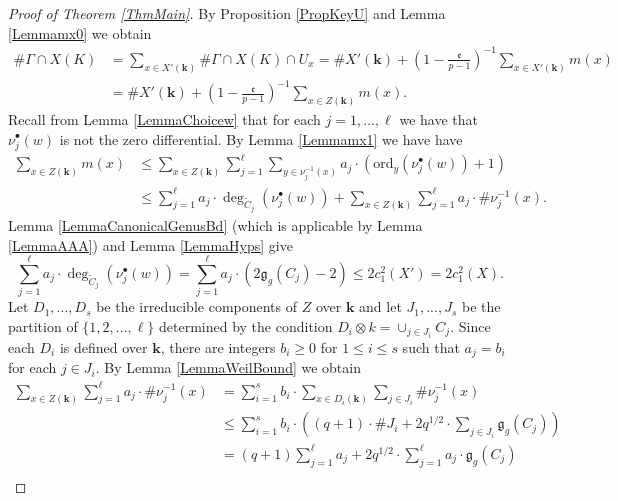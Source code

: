 \documentclass[11pt]{amsart}
\theoremstyle{remark}
\numberwithin{equation}{section}
\newcommand{\gfrak}{\mathfrak{g}}
\newcommand{\efrak}{\mathfrak{e}}
\newcommand{\kk}{\mathbf{k}}
\newcommand{\ord}{\mathrm{ord}}
\begin{document}
\begin{proof}[Proof of Theorem \ref{ThmMain}] By Proposition \ref{PropKeyU} and  Lemma \ref{Lemmamx0} we obtain
\begin{equation}\label{EqnFinalU}
\begin{aligned}
\# \Gamma\cap X(K)& =\sum_{x\in X'(\kk)} \# \Gamma \cap X(K)\cap U_x= \# X'(\kk) + \left(1-\frac{\efrak}{p-1}\right)^{-1}\sum_{x\in X'(\kk)} m(x)\\
&= \# X'(\kk) + \left(1-\frac{\efrak}{p-1}\right)^{-1}\sum_{x\in Z(\kk)} m(x).
\end{aligned}
\end{equation}
Recall from Lemma \ref{LemmaChoicew} that for each $j=1,...,\ell$ we have that $\nu_j^\bullet(w)$ is not the zero differential. By Lemma \ref{Lemmamx1} we have have 
\begin{equation}\label{EqnFinalm}
\begin{aligned}
\sum_{x\in Z(\kk)} m(x)&\le \sum_{x\in Z(\kk)} \sum_{j=1}^\ell \sum_{y\in \nu_j^{-1}(x)} a_j\cdot (\ord_y(\nu_j^\bullet(w))+1)\\
&\le \sum_{j=1}^\ell a_j\cdot \deg_{\widetilde{C}_j}(\nu_j^\bullet (w)) + \sum_{x\in Z(\kk)} \sum_{j=1}^\ell a_j\cdot \#\nu_j^{-1}(x).
\end{aligned}
\end{equation}
Lemma \ref{LemmaCanonicalGenusBd} (which is applicable by Lemma \ref{LemmaAAA}) and Lemma  \ref{LemmaHyps} give
\begin{equation}\label{EqnFinalS1}
\sum_{j=1}^\ell a_j\cdot \deg_{\widetilde{C}_j}(\nu_j^\bullet (w)) = \sum_{j=1}^\ell a_j\cdot (2 \gfrak_g({C}_j) -2)\le 2c_1^2(X')=2c_1^2(X).
\end{equation}
Let $D_1,..., D_s$ be the irreducible components of $Z$ over $\kk$ and let $J_1,...,J_s$ be the partition of $\{1,2,...,\ell\}$ determined by the condition $D_i\otimes k=\cup_{j\in J_i} C_j$. Since each $D_i$ is defined over $\kk$, there are integers $b_i\ge 0$ for $1\le i\le s$ such that $a_j=b_i$ for each $j\in J_i$. By Lemma \ref{LemmaWeilBound}   we obtain
$$
\begin{aligned}
\sum_{x\in Z(\kk)} \sum_{j=1}^\ell a_j\cdot \#\nu_j^{-1}(x) & =\sum_{i=1}^s b_i \cdot \sum_{x\in D_i(\kk)} \sum_{j\in J_i} \#\nu_j^{-1}(x) \\
& \le \sum_{i=1}^s b_i \cdot \left(  (q+1)\cdot \#J_i + 2q^{1/2}\cdot \sum_{j\in J_i} \gfrak_g(C_j) \right)\\
&= (q+1)\sum_{j=1}^\ell a_j + 2q^{1/2}\cdot \sum_{j=1}^\ell a_j\cdot \gfrak_g(C_j)\\

\end{aligned}$$
\end{proof}
\end{document}
